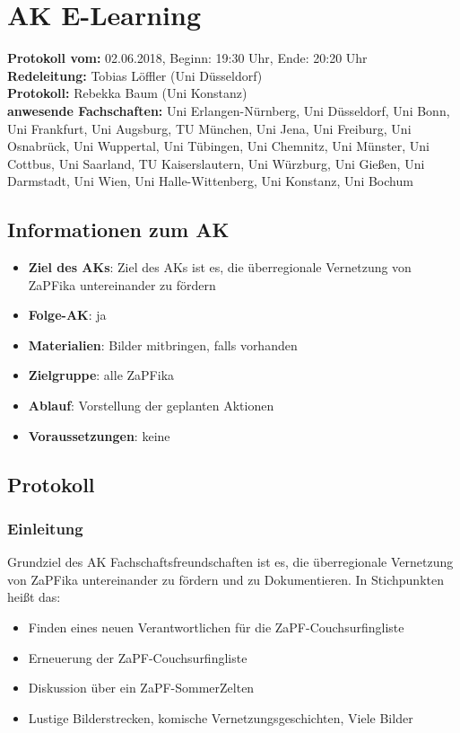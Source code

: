
\section{AK E-Learning}

\textbf{Protokoll vom:} 02.06.2018,
Beginn: 19:30 Uhr,
Ende: 20:20 Uhr \\
\textbf{Redeleitung:} Tobias Löffler (Uni Düsseldorf) \\
\textbf{Protokoll:} Rebekka Baum (Uni Konstanz) \\
\textbf{anwesende Fachschaften:} Uni Erlangen-Nürnberg, Uni Düsseldorf, Uni Bonn, Uni Frankfurt, Uni Augsburg,
TU München, Uni Jena, Uni Freiburg, Uni Osnabrück, Uni Wuppertal, Uni Tübingen, Uni Chemnitz, Uni Münster, Uni Cottbus, Uni Saarland,
TU Kaiserslautern, Uni Würzburg, Uni Gießen, Uni Darmstadt, Uni Wien, Uni Halle-Wittenberg, Uni Konstanz, Uni Bochum

\subsection*{Informationen zum AK}
  \begin{itemize}
  	\item \textbf{Ziel des AKs}: Ziel des AKs ist es, die überregionale Vernetzung von ZaPFika untereinander zu fördern
  	\item \textbf{Folge-AK}: ja
    \item \textbf{Materialien}: Bilder mitbringen, falls vorhanden
  	\item \textbf{Zielgruppe}: alle ZaPFika
  	\item \textbf{Ablauf}: Vorstellung der geplanten Aktionen
  	\item \textbf{Voraussetzungen}: keine
  \end{itemize}

\subsection*{Protokoll}
  \subsubsection*{Einleitung}
    Grundziel des AK Fachschaftsfreundschaften ist es, die überregionale Vernetzung von ZaPFika untereinander zu fördern und zu Dokumentieren. In Stichpunkten heißt das:
    \begin{itemize}
      \item Finden eines neuen Verantwortlichen für die ZaPF-Couchsurfingliste
      \item Erneuerung der ZaPF-Couchsurfingliste
      \item Diskussion über ein ZaPF-SommerZelten
      \item Lustige Bilderstrecken, komische Vernetzungsgeschichten, Viele Bilder
    \end{itemize}

